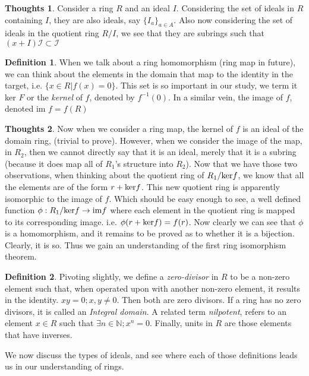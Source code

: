 \documentclass[12pt]{book}
\theoremstyle{definition}
\newtheorem*{definition}{Definition}
\newtheorem*{huh}{Thoughts}
\begin{document}
\begin{huh}
    Consider a ring $R$ and an ideal $I$. Considering the set of ideals in $R$ containing $I$, they are also ideals, say $\{I_a\}_{a \in A}$. Also now considering the set of ideals in the quotient ring $R/I$, we see that they are subrings such that $(x + I)\mathcal{I} \subset \mathcal{I}$
\end{huh}
\begin{definition}
    When we talk about a ring homomorphism (ring map in future), we can think about the elements in the domain that map to the identity in the target, i.e. $\{ x \in R| f(x) = 0\}$. This set is so important in our study, we term it ker $F$ or the \textit{kernel} of $f$, denoted by $f^{-1} (0)$. In a similar vein, the image of $f$, denoted im $f = f(R)$
\end{definition}
\begin{huh}
    Now when we consider a ring map, the kernel of $f$ is an ideal of the domain ring, (trivial to prove). However, when we consider the image of the map, in $R_2$, then we cannot directly say that it is an ideal, merely that it is a subring (because it does map all of $R_1$'s structure into $R_2$). Now that we have those two observations, when thinking about the quotient ring of $R_1/\textnormal{ker} f$, we know that all the elements are of the form $r + \textnormal{ker} f$. This new quotient ring is apparently isomorphic to the image of $f$. Which should be easy enough to see, a well defined function $\phi: R_1/\textnormal{ker} f \to \textnormal{im} f$ where each element in the quotient ring is mapped to its corresponding image. i.e. $\phi(r + \textnormal{ker} f) = f(r)$.
    Now clearly we can see that $\phi$ is a homomorphism, and it remains to be proved as to whether it is a bijection. Clearly, it is so. Thus we gain an understanding of the first ring isomorphism theorem.
\end{huh}
\begin{definition}
    Pivoting slightly, we define a \textit{zero-divisor} in $R$ to be a non-zero element such that, when operated upon with another non-zero element, it results in the identity. $xy = 0; x, y \neq 0$. Then both are zero divisors. If a ring has no zero divisors, it is called an \textit{Integral domain.} A related term \textit{nilpotent}, refers to an element $x \in R$ such that $\exists n \in \mathbb{N}; x^n = 0$. Finally, units in $R$ are those elements that have inverses.
\end{definition}
We now discuss the types of ideals, and see where each of those definitions leads us in our understanding of rings.
\end{document}
